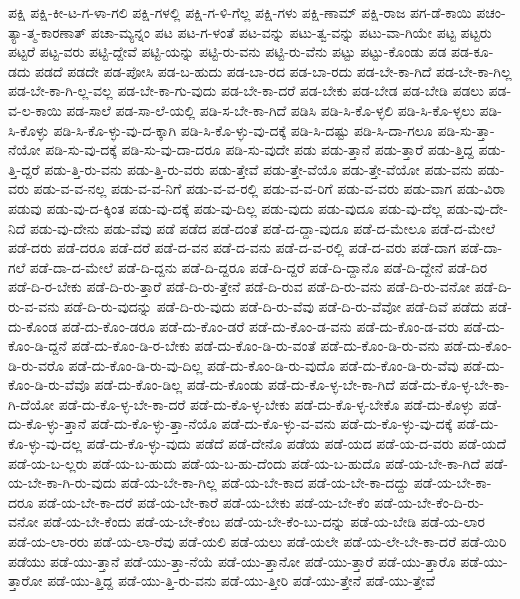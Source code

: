 {ಪಕ್ಷಿ
ಪಕ್ಷಿ-ಕೀ-ಟ-ಗ-ಳಾ-ಗಲಿ
ಪಕ್ಷಿ-ಗಳಲ್ಲಿ
ಪಕ್ಷಿ-ಗ-ಳಿ-ಗೆಲ್ಲ
ಪಕ್ಷಿ-ಗಳು
ಪಕ್ಷಿ-ಣಾಮ್
ಪಕ್ಷಿ-ರಾಜ
ಪಗ-ಡೆ-ಕಾಯಿ
ಪಚಂ-ತ್ಯಾ-ತ್ಮ-ಕಾರಣಾತ್
ಪಚಾ-ಮ್ಯನ್ನಂ
ಪಟ
ಪಟ-ಗ-ಳಂತೆ
ಪಟ-ವನ್ನು
ಪಟು-ತ್ವ-ವನ್ನು
ಪಟು-ವಾ-ಗಿಯೇ
ಪಟ್ಟ
ಪಟ್ಟರು
ಪಟ್ಟರೆ
ಪಟ್ಟ-ವರು
ಪಟ್ಟಿ-ದ್ದೇವೆ
ಪಟ್ಟಿ-ಯನ್ನು
ಪಟ್ಟಿ-ರು-ವನು
ಪಟ್ಟಿ-ರು-ವೆನು
ಪಟ್ಟು
ಪಟ್ಟು-ಕೊಂಡು
ಪಡ
ಪಡ-ಕೂ-ಡದು
ಪಡದೆ
ಪಡದೇ
ಪಡ-ಪೋಸಿ
ಪಡ-ಬ-ಹುದು
ಪಡ-ಬಾ-ರದ
ಪಡ-ಬಾ-ರದು
ಪಡ-ಬೇ-ಕಾ-ಗಿದೆ
ಪಡ-ಬೇ-ಕಾ-ಗಿಲ್ಲ
ಪಡ-ಬೇ-ಕಾ-ಗಿ-ಲ್ಲ-ವಲ್ಲ
ಪಡ-ಬೇ-ಕಾ-ಗು-ವುದು
ಪಡ-ಬೇ-ಕಾ-ದರೆ
ಪಡ-ಬೇಕು
ಪಡ-ಬೇಡ
ಪಡ-ಬೇಡಿ
ಪಡಲು
ಪಡ-ವ-ಲ-ಕಾಯಿ
ಪಡ-ಸಾಲೆ
ಪಡ-ಸಾ-ಲೆ-ಯಲ್ಲಿ
ಪಡಿ-ಸ-ಬೇ-ಕಾ-ಗಿದೆ
ಪಡಿಸಿ
ಪಡಿ-ಸಿ-ಕೊ-ಳ್ಳಲಿ
ಪಡಿ-ಸಿ-ಕೊ-ಳ್ಳಲು
ಪಡಿ-ಸಿ-ಕೊಳ್ಳು
ಪಡಿ-ಸಿ-ಕೊ-ಳ್ಳು-ವು-ದ-ಕ್ಕಾಗಿ
ಪಡಿ-ಸಿ-ಕೊ-ಳ್ಳು-ವು-ದಕ್ಕೆ
ಪಡಿ-ಸಿ-ದಷ್ಟು
ಪಡಿ-ಸಿ-ದಾ-ಗಲೂ
ಪಡಿ-ಸು-ತ್ತಾ-ನೆಯೋ
ಪಡಿ-ಸು-ವು-ದಕ್ಕೆ
ಪಡಿ-ಸು-ವು-ದಾ-ದರೂ
ಪಡಿ-ಸು-ವುದೇ
ಪಡು
ಪಡು-ತ್ತಾನೆ
ಪಡು-ತ್ತಾರೆ
ಪಡು-ತ್ತಿದ್ದ
ಪಡು-ತ್ತಿ-ದ್ದರೆ
ಪಡು-ತ್ತಿ-ರು-ವನು
ಪಡು-ತ್ತಿ-ರು-ವರು
ಪಡು-ತ್ತೇವೆ
ಪಡು-ತ್ತೇ-ವೆಯೊ
ಪಡು-ತ್ತೇ-ವೆಯೋ
ಪಡು-ವನು
ಪಡು-ವರು
ಪಡು-ವ-ವ-ನಲ್ಲ
ಪಡು-ವ-ವ-ನಿಗೆ
ಪಡು-ವ-ವ-ರಲ್ಲಿ
ಪಡು-ವ-ವ-ರಿಗೆ
ಪಡು-ವ-ವರು
ಪಡು-ವಾಗ
ಪಡು-ವಿರಾ
ಪಡುವು
ಪಡು-ವು-ದ-ಕ್ಕಿಂತ
ಪಡು-ವು-ದಕ್ಕೆ
ಪಡು-ವು-ದಿಲ್ಲ
ಪಡು-ವುದು
ಪಡು-ವುದೂ
ಪಡು-ವು-ದೆಲ್ಲ
ಪಡು-ವು-ದೇ-ನಿದೆ
ಪಡು-ವು-ದೇನು
ಪಡು-ವೆವು
ಪಡೆ
ಪಡೆದ
ಪಡೆ-ದಂತೆ
ಪಡೆ-ದ-ದ್ದಾ-ವುದೂ
ಪಡೆ-ದ-ಮೇಲೂ
ಪಡೆ-ದ-ಮೇಲೆ
ಪಡೆ-ದರು
ಪಡೆ-ದರೂ
ಪಡೆ-ದರೆ
ಪಡೆ-ದ-ವನ
ಪಡೆ-ದ-ವನು
ಪಡೆ-ದ-ವ-ರಲ್ಲಿ
ಪಡೆ-ದ-ವರು
ಪಡೆ-ದಾಗ
ಪಡೆ-ದಾ-ಗಲೆ
ಪಡೆ-ದಾ-ದ-ಮೇಲೆ
ಪಡೆ-ದಿ-ದ್ದನು
ಪಡೆ-ದಿ-ದ್ದರೂ
ಪಡೆ-ದಿ-ದ್ದರೆ
ಪಡೆ-ದಿ-ದ್ದಾನೊ
ಪಡೆ-ದಿ-ದ್ದೇನೆ
ಪಡೆ-ದಿರ
ಪಡೆ-ದಿ-ರ-ಬೇಕು
ಪಡೆ-ದಿ-ರು-ತ್ತಾರೆ
ಪಡೆ-ದಿ-ರು-ತ್ತೇನೆ
ಪಡೆ-ದಿ-ರುವ
ಪಡೆ-ದಿ-ರು-ವನು
ಪಡೆ-ದಿ-ರು-ವನೋ
ಪಡೆ-ದಿ-ರು-ವ-ವನು
ಪಡೆ-ದಿ-ರು-ವುದನ್ನು
ಪಡೆ-ದಿ-ರು-ವುದು
ಪಡೆ-ದಿ-ರು-ವೆವು
ಪಡೆ-ದಿ-ರು-ವೆವೋ
ಪಡೆ-ದಿವೆ
ಪಡೆದು
ಪಡೆ-ದು-ಕೊಂಡ
ಪಡೆ-ದು-ಕೊಂ-ಡರೂ
ಪಡೆ-ದು-ಕೊಂ-ಡರೆ
ಪಡೆ-ದು-ಕೊಂ-ಡ-ವನು
ಪಡೆ-ದು-ಕೊಂ-ಡ-ವರು
ಪಡೆ-ದು-ಕೊಂ-ಡಿ-ದ್ದನೆ
ಪಡೆ-ದು-ಕೊಂ-ಡಿ-ರ-ಬೇಕು
ಪಡೆ-ದು-ಕೊಂ-ಡಿ-ರು-ವಂತೆ
ಪಡೆ-ದು-ಕೊಂ-ಡಿ-ರು-ವನು
ಪಡೆ-ದು-ಕೊಂ-ಡಿ-ರು-ವರೊ
ಪಡೆ-ದು-ಕೊಂ-ಡಿ-ರು-ವು-ದಿಲ್ಲ
ಪಡೆ-ದು-ಕೊಂ-ಡಿ-ರು-ವುದೊ
ಪಡೆ-ದು-ಕೊಂ-ಡಿ-ರು-ವೆವು
ಪಡೆ-ದು-ಕೊಂ-ಡಿ-ರು-ವೆವೊ
ಪಡೆ-ದು-ಕೊಂ-ಡಿಲ್ಲ
ಪಡೆ-ದು-ಕೊಂಡು
ಪಡೆ-ದು-ಕೊ-ಳ್ಳ-ಬೇ-ಕಾ-ಗಿದೆ
ಪಡೆ-ದು-ಕೊ-ಳ್ಳ-ಬೇ-ಕಾ-ಗಿ-ದೆಯೋ
ಪಡೆ-ದು-ಕೊ-ಳ್ಳ-ಬೇ-ಕಾ-ದರೆ
ಪಡೆ-ದು-ಕೊ-ಳ್ಳ-ಬೇಕು
ಪಡೆ-ದು-ಕೊ-ಳ್ಳ-ಬೇಕೊ
ಪಡೆ-ದು-ಕೊಳ್ಳು
ಪಡೆ-ದು-ಕೊ-ಳ್ಳು-ತ್ತಾನೆ
ಪಡೆ-ದು-ಕೊ-ಳ್ಳು-ತ್ತಾ-ನೆಯೊ
ಪಡೆ-ದು-ಕೊ-ಳ್ಳು-ವ-ವನು
ಪಡೆ-ದು-ಕೊ-ಳ್ಳು-ವು-ದಕ್ಕೆ
ಪಡೆ-ದು-ಕೊ-ಳ್ಳು-ವು-ದಲ್ಲ
ಪಡೆ-ದು-ಕೊ-ಳ್ಳು-ವುದು
ಪಡೆದೆ
ಪಡೆ-ದೇನೊ
ಪಡೆಯ
ಪಡೆ-ಯದ
ಪಡೆ-ಯ-ದ-ವರು
ಪಡೆ-ಯದೆ
ಪಡೆ-ಯ-ಬ-ಲ್ಲರು
ಪಡೆ-ಯ-ಬ-ಹುದು
ಪಡೆ-ಯ-ಬ-ಹು-ದೆಂದು
ಪಡೆ-ಯ-ಬ-ಹುದೊ
ಪಡೆ-ಯ-ಬೇ-ಕಾ-ಗಿದೆ
ಪಡೆ-ಯ-ಬೇ-ಕಾ-ಗಿ-ರು-ವುದು
ಪಡೆ-ಯ-ಬೇ-ಕಾ-ಗಿಲ್ಲ
ಪಡೆ-ಯ-ಬೇ-ಕಾದ
ಪಡೆ-ಯ-ಬೇ-ಕಾ-ದದ್ದು
ಪಡೆ-ಯ-ಬೇ-ಕಾ-ದರೂ
ಪಡೆ-ಯ-ಬೇ-ಕಾ-ದರೆ
ಪಡೆ-ಯ-ಬೇ-ಕಾರೆ
ಪಡೆ-ಯ-ಬೇಕು
ಪಡೆ-ಯ-ಬೇ-ಕೆಂ
ಪಡೆ-ಯ-ಬೇ-ಕೆಂ-ದಿ-ರು-ವನೋ
ಪಡೆ-ಯ-ಬೇ-ಕೆಂದು
ಪಡೆ-ಯ-ಬೇ-ಕೆಂಬ
ಪಡೆ-ಯ-ಬೇ-ಕೆಂ-ಬು-ದನ್ನು
ಪಡೆ-ಯ-ಬೇಡಿ
ಪಡೆ-ಯ-ಲಾರ
ಪಡೆ-ಯ-ಲಾ-ರರು
ಪಡೆ-ಯ-ಲಾ-ರೆವು
ಪಡೆ-ಯಲಿ
ಪಡೆ-ಯಲು
ಪಡೆ-ಯಲೇ
ಪಡೆ-ಯ-ಲೇ-ಬೇ-ಕಾ-ದರೆ
ಪಡೆ-ಯಿರಿ
ಪಡೆಯು
ಪಡೆ-ಯು-ತ್ತಾನೆ
ಪಡೆ-ಯು-ತ್ತಾ-ನೆಯೆ
ಪಡೆ-ಯು-ತ್ತಾನೋ
ಪಡೆ-ಯು-ತ್ತಾರೆ
ಪಡೆ-ಯು-ತ್ತಾರೊ
ಪಡೆ-ಯು-ತ್ತಾರೋ
ಪಡೆ-ಯು-ತ್ತಿದ್ದ
ಪಡೆ-ಯು-ತ್ತಿ-ರು-ವನು
ಪಡೆ-ಯು-ತ್ತೀರಿ
ಪಡೆ-ಯು-ತ್ತೇನೆ
ಪಡೆ-ಯು-ತ್ತೇವೆ
}
